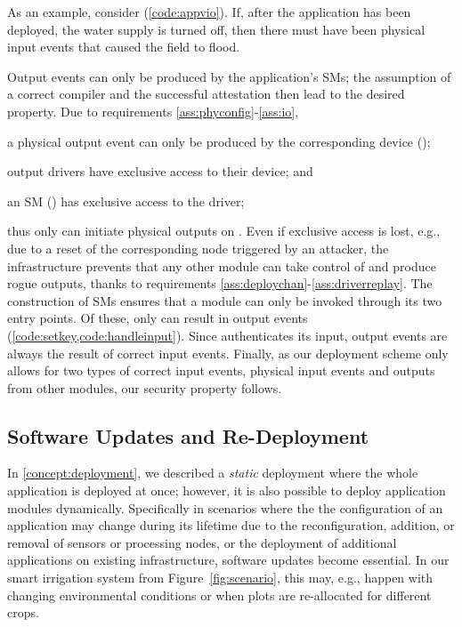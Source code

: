 As an example, consider \appvio{} (\cref{code:appvio}). If, after the
application has been deployed, the water supply is turned off, then there must
have been physical input events that caused the field to flood.

Output events can only be produced by the application's \acp{SM}; the assumption
of a correct compiler and the successful attestation then lead to the desired
property.
%
 Due to requirements \ref{ass:phyconfig}-\ref{ass:io},
%
\begin{paraenum}
%
  \item a physical output event can only be produced by the corresponding
device ();
%
  \item output drivers have exclusive access to their device; and
%
  \item an \ac{SM} () has exclusive access to the driver;
%
\end{paraenum}
%
thus only  can initiate physical outputs on .  Even if
exclusive access is lost, e.g., due to a reset of the corresponding node
triggered by an attacker, the infrastructure prevents that any other module can
take control of  and produce rogue outputs, thanks to requirements
\ref{ass:deploychan}-\ref{ass:driverreplay}.
%
The construction of \acp{SM} ensures that a module can only be invoked through
its two entry points.  Of these, only \handleinput{} can result in output events
(\cref{code:setkey,code:handleinput}).  Since \handleinput{} authenticates its
input, output events are always the result of correct input events. Finally, as
our deployment scheme only allows for two types of correct input events,
physical input events and outputs from other modules, our security property
follows.

\subsection{Software Updates and Re-Deployment}
\label{concept:updates}

In \cref{concept:deployment}, we described a \emph{static} deployment where the
whole application is deployed at once; however, it is also possible to deploy
application modules dynamically. Specifically in scenarios where the the
configuration of an application may change during its lifetime due to the
reconfiguration, addition, or removal of sensors or processing nodes, or the
deployment of additional applications on existing infrastructure, software
updates become essential. In our smart irrigation system from
Figure~\ref{fig:scenario}, this may, e.g., happen with changing environmental
conditions or when plots are re-allocated for different crops.

